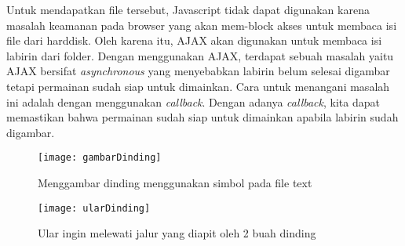Untuk mendapatkan file tersebut, Javascript tidak dapat digunakan karena masalah keamanan pada browser yang akan mem-block akses untuk membaca isi file dari harddisk. Oleh karena itu, AJAX akan digunakan untuk membaca isi labirin dari folder. Dengan menggunakan AJAX, terdapat sebuah masalah yaitu AJAX bersifat \textit{asynchronous} yang menyebabkan labirin belum selesai digambar tetapi permainan sudah siap untuk dimainkan. Cara untuk menangani masalah ini adalah dengan menggunakan \textit{callback}. Dengan adanya \textit{callback}, kita dapat memastikan bahwa permainan sudah siap untuk dimainkan apabila labirin sudah digambar.\\ 


\begin{figure}[H]
	\centering  
	\texttt{[image: gambarDinding]}  
	\caption[Menggambar dinding menggunakan simbol pada file text]{Menggambar dinding menggunakan simbol pada file text}
	\label{fig:gambarDinding} 
\end{figure}

\begin{figure}[H]
	\centering  
	\texttt{[image: ularDinding]}  
	\caption[Ular ingin melewati jalur yang diapit oleh 2 buah dinding]{Ular ingin melewati jalur yang diapit oleh 2 buah dinding}
	\label{fig:ularDinding} 
\end{figure}


